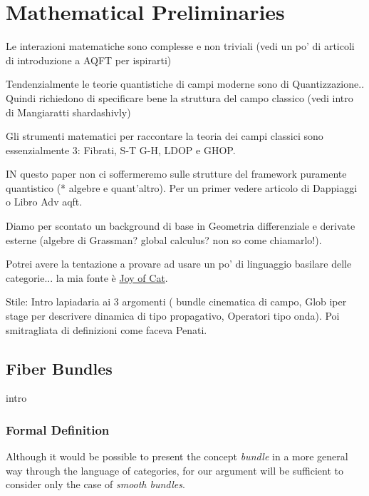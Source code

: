 \documentclass[Main]{subfiles}
\begin{document}
\chapter{Mathematical Preliminaries}

	\begin{Warning}
		Le interazioni matematiche sono complesse  e non triviali (vedi un po' di articoli di introduzione a AQFT per ispirarti)
		
		Tendenzialmente le teorie quantistiche di campi moderne sono di Quantizzazione.. Quindi richiedono di specificare bene la struttura del campo classico (vedi intro di Mangiaratti shardashivly)
		
		Gli strumenti matematici per raccontare la teoria dei campi classici sono essenzialmente 3: Fibrati, S-T G-H, LDOP e GHOP.
		
		IN questo paper non ci soffermeremo sulle strutture del framework puramente quantistico (* algebre e quant'altro). Per un primer vedere articolo di Dappiaggi o Libro Adv aqft.
		
		Diamo per scontato un background di base in Geometria differenziale e derivate esterne (algebre di Grassman? global calculus? non so come chiamarlo!).
		
		Potrei avere la tentazione a provare ad usare un po' di linguaggio basilare delle categorie... la mia fonte è \href{http://katmat.math.uni-bremen.de/acc/acc.pdf}{Joy of Cat}.
	\end{Warning}
	
	\begin{Warning}
		Stile: Intro lapiadaria ai 3 argomenti ( bundle cinematica di campo, Glob iper stage per descrivere dinamica di tipo propagativo, Operatori tipo onda). Poi smitragliata di definizioni come faceva Penati.
	\end{Warning}	


	\section{Fiber Bundles}
		\danger intro
		
		\subsection{Formal Definition}
			Although it would be possible to present the concept \emph{bundle} in a more general way through the language of categories, for our argument will be sufficient to consider only the case of \emph{smooth bundles}.
\end{document}
